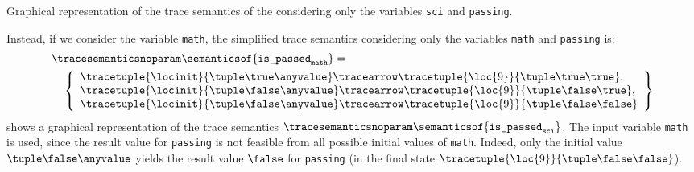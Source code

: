 \begin{example}
\begin{marginfigure}[*-9]
\caption{Graphical representation of the trace semantics of the  considering only the variables \texttt{sci} and \texttt{passing}.}
\end{marginfigure}

Instead, if we consider the variable \texttt{math}, the simplified trace semantics considering only the variables \texttt{math} and \texttt{passing} is:
\begin{align*}
  &{\tracesemanticsnoparam\semanticsof{\texttt{is\_passed}_\texttt{math}}
  =}\\
  &\quad\left\{
    \begin{array}{l}
    \tracetuple{\locinit}{\tuple\true\anyvalue}\tracearrow\tracetuple{\loc{9}}{\tuple\true\true}, \\
    \tracetuple{\locinit}{\tuple\false\anyvalue}\tracearrow\tracetuple{\loc{9}}{\tuple\false\true}, \\
    \tracetuple{\locinit}{\tuple\false\anyvalue}\tracearrow\tracetuple{\loc{9}}{\tuple\false\false}
  \end{array}
  \right\}
\end{align*}
 shows a graphical representation of the trace semantics $\tracesemanticsnoparam\semanticsof{\texttt{is\_passed}_\texttt{sci}}$.
The input variable \texttt{math} is used, since the result value for \texttt{passing} is not feasible from all possible initial values of \texttt{math}.
Indeed, only the initial value $\tuple\false\anyvalue$ yields the result value $\false$ for \texttt{passing} (in the final state $\tracetuple{\loc{9}}{\tuple\false\false}$).
\end{example}


